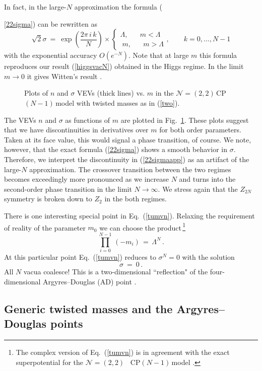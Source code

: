 \documentclass[epsfig,12pt]{article}
\def\beq{\begin{equation}}
\def\eeq{\end{equation}}
\newcommand{\ntt}{${\mathcal N}=(2,2)\,$}
\newcommand{\cpn}{CP$(N-1)\,$}
\def\beq{\begin{equation}}
\def\eeq{\end{equation}}
\newcommand{\ntwot}{${\mathcal N}= \left(2,2\right) $ }
\begin{document}
In fact, in the large-$N$ approximation the formula ({\ref{22sigma}) can be rewritten as
\beq
\sqrt{2}\sigma ~=~ \exp\left( \frac{2\pi\,i\, k}{N}
\right)\times \left\{
\begin{array}{cc}
\Lambda,\;\;\;\;\;\;m <\Lambda\\[1mm]
\;m,\;\;\;\;\;\; m > \Lambda
\end{array},
\right.
 \qquad k=0, ..., N-1
\label{22sigmaapp}
\eeq
with the exponential accuracy   $O\left(e^{-N}\right)$. Note that at large $m$ this formula reproduces our
result (\ref{higgsvacN}) obtained in the Higgs regime. In the limit $m\to 0$ it gives Witten's
result  \cite{W79}.

\begin{figure}
\centerline{}
\caption{\small Plots of $n$ and $\sigma$ VEVs (thick lines) vs. $m$
in the \ntt \cpn model with twisted masses as in (\ref{two}). }
\label{fig22nsigma}
\end{figure}

The  VEVs $n$ and $\sigma$ as functions of $m$ are plotted in Fig.~\ref{fig22nsigma}.
These plots suggest that we have  discontinuities in derivatives over $m$ for both order
parameters. Taken at its face value, this would signal a phase transition, of course. We note, however, that 
the exact formula
(\ref{22sigma}) shows a smooth behavior in $\sigma$. Therefore, we interpret the discontinuity in
(\ref{22sigmaapp}) as an artifact of the large-$N$ approximation. The crossover transition between 
the two regimes becomes exceedingly more pronounced as we increase 
$N$ and turns into the second-order phase transition in the
limit $N\to\infty$. We stress again that the $Z_{2N}$ symmetry is broken down to $Z_2$ in 
the both regimes.

There is one interesting special point in Eq.~(\ref{tumvn}).
Relaxing the requirement of reality of the parameter $m_0$ we can choose the 
product\,\footnote{The complex version of Eq.~(\ref{tumvn}) is in agreement
with the exact superpotential for the \mbox{\ntwot} \cpn model
\cite{AdDVecSal,ChVa,W93,HaHo,Dor}.}
\beq
\prod_{i=0}^{N-1}\,(-m_i) \,=\,\Lambda^N\,.
\label{ADpoint}
\eeq
At this particular point 
 Eq.~(\ref{tumvn}) reduces to $\sigma^N =0$ with the solution
\beq
\sigma ~=~ 0\,.
\label{ADsigma}
\eeq
All $N$ vacua coalesce!  
This is a two-dimensional ``reflection" of the four-dimensional
Argyres--Douglas (AD) point \cite{AD,APSW}.


\subsection{Generic twisted masses and  the Argyres--Douglas points}
\label{genadp}

}
\end{document}
